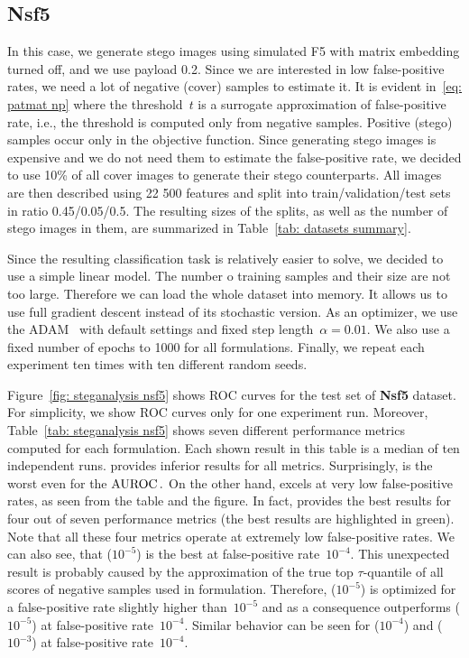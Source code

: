 \subsection{Nsf5}

In this case, we generate stego images using simulated F5 with matrix embedding turned off, and we use payload 0.2. Since we are interested in low false-positive rates, we need a lot of negative (cover) samples to estimate it. It is evident in~\eqref{eq: patmat np} where the threshold~$t$ is a surrogate approximation of false-positive rate, i.e., the threshold is computed only from negative samples. Positive (stego) samples occur only in the objective function. Since generating stego images is expensive and we do not need them to estimate the false-positive rate, we decided to use 10\% of all cover images to generate their stego counterparts. All images are then described using 22 500 features and split into train/validation/test sets in ratio 0.45/0.05/0.5. The resulting sizes of the splits, as well as the number of stego images in them, are summarized in Table~\ref{tab: datasets summary}. 

Since the resulting classification task is relatively easier to solve, we decided to use a simple linear model. The number o training samples and their size are not too large. Therefore we can load the whole dataset into memory. It allows us to use full gradient descent instead of its stochastic version. As an optimizer, we use the ADAM~\cite{kingma2014adam} with default settings and fixed step length~$\alpha = 0.01.$ We also use a fixed number of epochs to 1000 for all formulations. Finally, we repeat each experiment ten times with ten different random seeds.

Figure~\ref{fig: steganalysis nsf5} shows ROC curves for the test set of \textbf{Nsf5} dataset. For simplicity, we show ROC curves only for one experiment run. Moreover, Table~\ref{tab: steganalysis nsf5} shows seven different performance metrics computed for each formulation. Each shown result in this table is a median of ten independent runs. \BaseLine provides inferior results for all metrics. Surprisingly, \BaseLine is the worst even for the $\operatorname{AUROC}.$ On the other hand, \DeepTopPush excels at very low false-positive rates, as seen from the table and the figure. In fact, \DeepTopPush provides the best results for four out of seven performance metrics (the best results are highlighted in green). Note that all these four metrics operate at extremely low false-positive rates. We can also see, that \PatMatNP($10^{-5}$) is the best at false-positive rate~$10^{-4}$. This unexpected result is probably caused by the approximation of the true top $\tau$-quantile of all scores of negative samples used in \PatMatNP formulation. Therefore, \PatMatNP($10^{-5}$) is optimized for a false-positive rate slightly higher than~$10^{-5}$ and as a consequence outperforms \PatMatNP($10^{-5}$) at false-positive rate~$10^{-4}$. Similar behavior can be seen for \PatMatNP($10^{-4}$) and \PatMatNP($10^{-3}$) at false-positive rate~$10^{-4}$.

